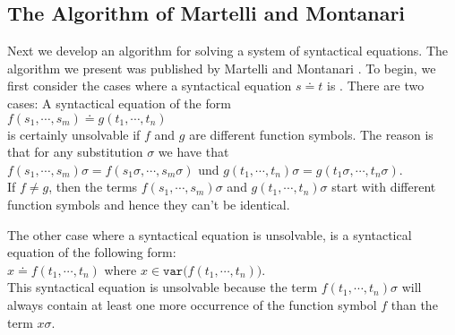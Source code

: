 \subsection{The Algorithm of Martelli and Montanari}
Next we develop an algorithm for solving a system of syntactical equations.
The algorithm we present was published by Martelli and Montanari
\cite{martelli:1982}.  
To begin, we first consider the cases where a syntactical equation $s \doteq t$ is .
There are two cases: A syntactical equation of the form
\\[0.2cm]
\hspace*{1.3cm}
$f(s_1,\cdots,s_m) \doteq g(t_1,\cdots, t_n)$ \\[0.2cm]
is certainly unsolvable if  $f$ and $g$ are different function symbols. The reason is that for any substitution
$\sigma$ we have that \\[0.2cm]
\hspace*{1.0cm} $f(s_1,\cdots,s_m)\sigma = f(s_1\sigma,\cdots,s_m\sigma)$ \quad und \quad
                $g(t_1,\cdots, t_n)\sigma = g(t_1\sigma,\cdots,t_n\sigma)$. \\[0.2cm]
If $f \not = g$, then the terms  $f(s_1,\cdots,s_m)\sigma$ and $g(t_1,\cdots, t_n)\sigma$ start with different
function symbols and hence they can't be identical.

The other case where a syntactical equation is unsolvable, is a syntactical equation of the following form:
\\[0.2cm]
\hspace*{1.3cm}
$x \doteq f(t_1,\cdots,t_n)$  \quad where $x \in \texttt{var}\big(f(t_1,\cdots,t_n)\big)$.
\\[0.2cm]
This syntactical equation is unsolvable because the term $f(t_1,\cdots,t_n)\sigma$ will always contain at least one more
occurrence of the function symbol $f$ than the term $x\sigma$.

